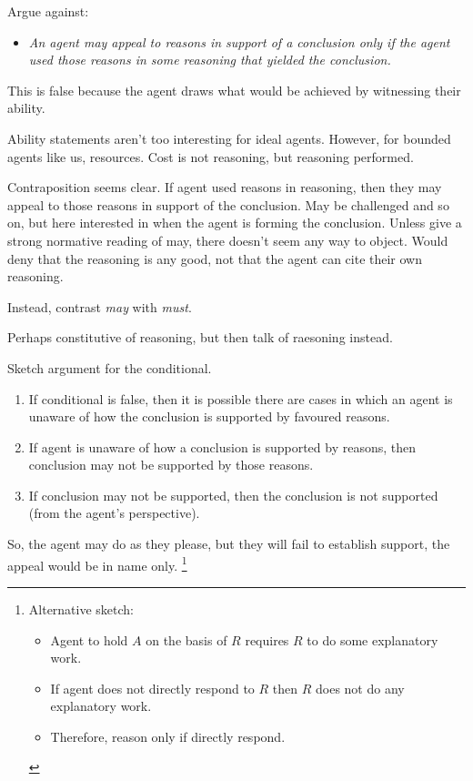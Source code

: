 \documentclass[10pt]{article}
\begin{document}
Argue against:
\begin{itemize}
\item\label{denied-claim} \emph{An agent may appeal to reasons in support of a conclusion only if the agent used those reasons in some reasoning that yielded the conclusion.}
\end{itemize}

{
  \color{red}
  This is false because the agent draws what would be achieved by witnessing their ability.
}

{
  \color{red}
  Ability statements aren't too interesting for ideal agents.
  However, for bounded agents like us, resources.
  Cost is not reasoning, but reasoning performed.
}

Contraposition seems clear.
If agent used reasons in reasoning, then they may appeal to those reasons in support of the conclusion.
May be challenged and so on, but here interested in when the agent is forming the conclusion.
Unless give a strong normative reading of may, there doesn't seem any way to object.
Would deny that the reasoning is any good, not that the agent can cite their own reasoning.

Instead, contrast \emph{may} with \emph{must}.

Perhaps constitutive of reasoning, but then talk of raesoning instead.

Sketch argument for the conditional.

\begin{enumerate}
\item\label{opp:sketch:1} If conditional is false, then it is possible there are cases in which an agent is unaware of how the conclusion is supported by favoured reasons.
\item\label{opp:sketch:2} If agent is unaware of how a conclusion is supported by reasons, then conclusion may not be supported by those reasons.
\item\label{opp:sketch:3} If conclusion may not be supported, then the conclusion is not supported (from the agent's perspective).
\end{enumerate}

So, the agent may do as they please, but they will fail to establish support, the appeal would be in name only.\nolinebreak
\footnote{
  Alternative sketch:
  \begin{itemize}
  \item Agent to hold \(A\) on the basis of \(R\) requires \(R\) to do some explanatory work.
  \item If agent does not directly respond to \(R\) then \(R\) does not do any explanatory work.
  \item Therefore, reason only if directly respond.
  \end{itemize}
}
\end{document}
